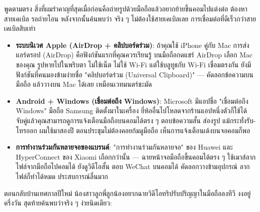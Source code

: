 


พูดตามตรง สิ่งที่ผมรำคาญที่สุดเมื่อก่อนคือถ่ายรูปด้วยมือถือแล้วอยากย้ายขึ้นคอมไปแต่งต่อ ต้องหาสายเคเบิล รอถ่ายโอน หลังจากนั้นค้นพบว่า จริง ๆ ไม่ต้องใช้สายเคเบิลเลย การเชื่อมต่อที่ดีเร็วกว่าสายเคเบิลสิบเท่า

\begin{itemize}
  \item \textbf{ระบบนิเวศ Apple (AirDrop + คลิปบอร์ดร่วม)}: ถ้าคุณใช้ iPhone คู่กับ Mac การส่งแอร์ดรอป (AirDrop) คือฟังก์ชันแรกที่คุณควรเรียนรู้ บนมือถือกดแชร์ AirDrop เลือก Mac ของคุณ รูปหายไปในพริบตา ไม่ใช้เน็ต ไม่ใช้ Wi-Fi แต่ใช้บลูทูธกับ Wi-Fi เชื่อมตรงกัน ยังมีฟังก์ชันที่คนมองข้ามง่ายชื่อ "คลิปบอร์ดร่วม (Universal Clipboard)" — คัดลอกข้อความบนมือถือ แล้ววางบน Mac ได้เลย เหมือนเวทมนตร์ชะมัด
  \item \textbf{Android + Windows (เชื่อมต่อถึง Windows)}: Microsoft มีแอปชื่อ "เชื่อมต่อถึง Windows" มือถือ Samsung ติดตั้งมาในเครื่อง ยี่ห้ออื่นไปโหลดจากร้านแอปหนึ่งตัวก็ใช้ได้ จับคู่แล้วคุณสามารถดูการแจ้งเตือนมือถือบนคอมได้ตรง ๆ ตอบข้อความสั้น ส่องรูป แม้กระทั่งรับ-โทรออก ผมใช้มาสองปี ตอนประชุมไม่ต้องคอยก้มดูมือถือ เห็นการแจ้งเตือนเด้งบนจอคอมก็พอ
  \item \textbf{การทำงานร่วมกันหลายจอของแบรนด์}: "การทำงานร่วมกันหลายจอ" ของ Huawei และ HyperConnect ของ Xiaomi เถือกกว่านั้น — ฉายหน้าจอมือถือขึ้นคอมได้ตรง ๆ ใช้เมาส์ลากไฟล์จากมือถือไปคอมได้ ยังดูวิดีโอสั้น ตอบ WeChat บนคอมได้ คัดลอกวางข้ามอุปกรณ์ ลากไฟล์ก็ทำได้หมด ประสบการณ์ลื่นมาก
\end{itemize}


ตอนกลับบ้านเทศกาลปีใหม่ น้องสาวลูกพี่ลูกน้องอยากฉายวิดีโอทริปรับปริญญาในมือถือลงทีวี งงอยู่ครึ่งวัน สุดท้ายค้นพบว่าจริง ๆ ง่ายนิดเดียว:

